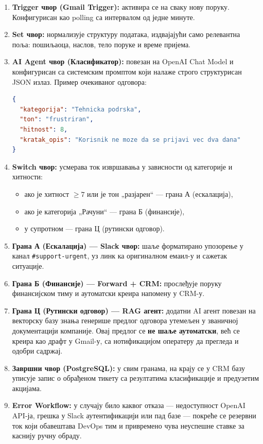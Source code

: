 \begin{enumerate}
    \item \textbf{Trigger чвор (Gmail Trigger):} активира се на сваку
    нову поруку. Конфигурисан као polling са интервалом од једне
    минуте.

    \item \textbf{Set чвор:} нормализује структуру података,
    издвајајући само релевантна поља: пошиљаоца, наслов, тело
    поруке и време пријема.

    \item \textbf{AI Agent чвор (Класификатор):} повезан на OpenAI
    Chat Model и конфигурисан са системским промптом који налаже
    строго структурисан JSON излаз. Пример очекиваног одговора:

\begin{lstlisting}[language=json, caption={Strukturisan izlaz klasifikacionog agenta}]
{
  "kategorija": "Tehnicka podrska",
  "ton": "frustriran",
  "hitnost": 8,
  "kratak_opis": "Korisnik ne moze da se prijavi vec dva dana"
}
\end{lstlisting}

    \item \textbf{Switch чвор:} усмерава ток извршавања у зависности
    од категорије и хитности:
    \begin{itemize}
        \item ако је хитност $\geq 7$ или је тон „разјарен“ —
        грана А (ескалација),
        \item ако је категорија „Рачуни“ — грана Б (финансије),
        \item у супротном — грана Ц (рутински одговор).
    \end{itemize}

    \item \textbf{Грана А (Ескалација) — Slack чвор:} шаље форматирано
    упозорење у канал \texttt{\#support-urgent}, уз линк ка оригиналном
    емаил-у и сажетак ситуације.

    \item \textbf{Грана Б (Финансије) — Forward + CRM:} прослеђује
    поруку финансијском тиму и аутоматски креира напомену у CRM-у.

    \item \textbf{Грана Ц (Рутински одговор) — RAG агент:} додатни AI
    агент повезан на векторску базу знања генерише предлог одговора
    утемељен у званичној документацији компаније. Овај предлог се
    \textbf{не шаље аутоматски}, већ се креира као драфт у Gmail-у,
    са нотификацијом оператеру да прегледа и одобри садржај.

    \item \textbf{Завршни чвор (PostgreSQL):} у свим гранама, на крају
    се у CRM базу уписује запис о обрађеном тикету са резултатима
    класификације и предузетим акцијама.

    \item \textbf{Error Workflow:} у случају било каквог отказа —
    недоступност OpenAI API-ја, грешка у Slack аутентификацији или
    пад базе — покреће се резервни ток који обавештава DevOps тим
    и привремено чува неуспешне ставке за каснију ручну обраду.
\end{enumerate}

